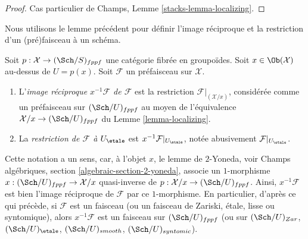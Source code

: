 \begin{proof}
Cas particulier de Champs, Lemme \ref{stacks-lemma-localizing}.
\end{proof}

\noindent
Nous utilisons le lemme précédent pour définir l'image réciproque et la restriction
d'un (pré)faisceau à un schéma.

\begin{definition}
\label{definition-pullback}
Soit $p : \mathcal{X} \to (\Sch/S)_{fppf}$ une catégorie fibrée
en groupoïdes. Soit $x \in \Ob(\mathcal{X})$ au-dessus de $U = p(x)$.
Soit $\mathcal{F}$ un préfaisceau sur $\mathcal{X}$.
\begin{enumerate}
\item L'{\it image réciproque $x^{-1}\mathcal{F}$ de $\mathcal{F}$} est la
restriction $\mathcal{F}|_{(\mathcal{X}/x)}$, considérée comme un préfaisceau sur
$(\Sch/U)_{fppf}$ au moyen de l'équivalence
$\mathcal{X}/x \to (\Sch/U)_{fppf}$ du
Lemme \ref{lemma-localizing}.
\item La {\it restriction de $\mathcal{F}$ à $U_\etale$}
est $x^{-1}\mathcal{F}|_{U_\etale}$, notée abusivement
$\mathcal{F}|_{U_\etale}$.
\end{enumerate}
\end{definition}

\noindent
Cette notation a un sens, car, à l'objet $x$, le lemme de $2$-Yoneda, voir
Champs algébriques, section \ref{algebraic-section-2-yoneda},
associe un $1$-morphisme $x : (\Sch/U)_{fppf} \to \mathcal{X}/x$
quasi-inverse de $p : \mathcal{X}/x \to (\Sch/U)_{fppf}$.
Ainsi, $x^{-1}\mathcal{F}$ est bien l'image réciproque de $\mathcal{F}$ par ce
$1$-morphisme. En particulier, d'après ce qui précède, si $\mathcal{F}$
est un faisceau (ou un faisceau de Zariski, \'etale, lisse ou syntomique), alors
$x^{-1}\mathcal{F}$ est un faisceau sur $(\Sch/U)_{fppf}$ (ou sur
$(\Sch/U)_{Zar}$, $(\Sch/U)_\etale$,
$(\Sch/U)_{smooth}$, $(\Sch/U)_{syntomic}$).

